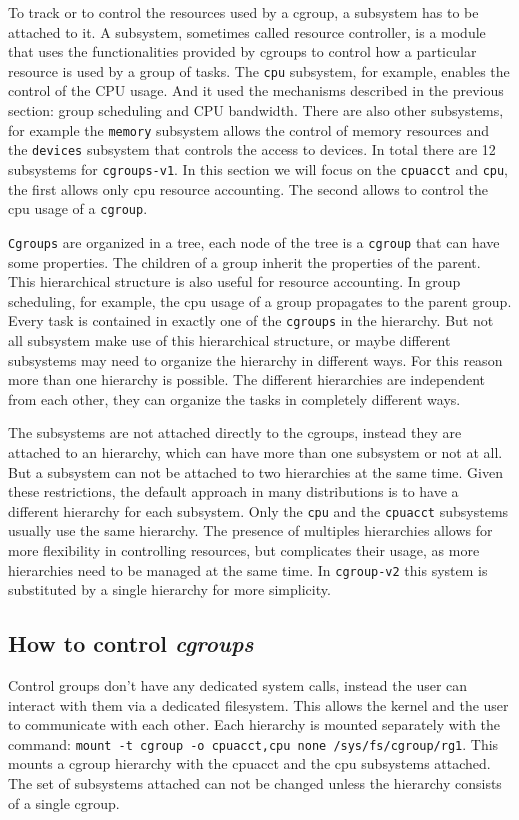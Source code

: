 To track or to control the resources used by a cgroup, a subsystem has to be attached to it. A subsystem, sometimes called resource controller, is a module that uses the functionalities provided by cgroups to control how a particular resource is used by a group of tasks. The \verb|cpu| subsystem, for example, enables the control of the CPU usage. And it used the mechanisms described in the previous section: group scheduling and CPU bandwidth. There are also other subsystems, for example the \verb|memory| subsystem allows the control of memory resources and the \verb|devices| subsystem that controls the access to devices. In total there are 12 subsystems for \verb|cgroups-v1|. In this section we will focus on the \verb|cpuacct| and \verb|cpu|, the first allows only cpu resource accounting. The second allows to control the cpu usage of a \verb|cgroup|.

\verb|Cgroups| are organized in a tree, each node of the tree is a \verb|cgroup| that can have some properties. The children of a group inherit the properties of the parent. This hierarchical structure is also useful for resource accounting. In group scheduling, for example, the cpu usage of a group propagates to the parent group. Every task is contained in exactly one of the \verb|cgroups| in the hierarchy. But not all subsystem make use of this hierarchical structure, or maybe different subsystems may need to organize the hierarchy in different ways. For this reason more than one hierarchy is possible. The different hierarchies are independent from each other, they can organize the tasks in completely different ways.

The subsystems are not attached directly to the cgroups, instead they are attached to an hierarchy, which can have more than one subsystem or not at all. But a subsystem can not be attached to two hierarchies at the same time. Given these restrictions, the default approach in many distributions is to have a different hierarchy for each subsystem. Only the \verb|cpu| and the \verb|cpuacct| subsystems usually use the same hierarchy. The presence of multiples hierarchies allows for more flexibility in controlling resources, but complicates their usage, as more hierarchies need to be managed at the same time. In \verb|cgroup-v2| this system is substituted by a single hierarchy for more simplicity.

\subsection{How to control \textit{cgroups}}
Control groups don't have any dedicated system calls, instead the user can interact with them via a dedicated filesystem. This allows the kernel and the user to communicate with each other. Each hierarchy is mounted separately with the command: \verb|mount -t cgroup -o cpuacct,cpu none /sys/fs/cgroup/rg1|. \newline This mounts a cgroup hierarchy with the cpuacct and the cpu subsystems attached. The set of subsystems attached can not be changed unless the hierarchy consists of a single cgroup.

